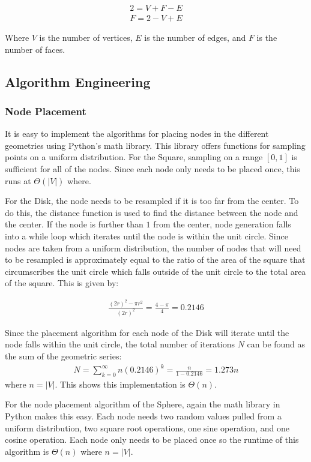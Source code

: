 \documentclass{article}
\begin{document}
        \begin{align}
            2 = V + F - E \\
            F = 2 - V + E
        \end{align}

        Where $V$ is the number of vertices, $E$ is the number of edges, and $F$ is the number of faces.

    \subsection{Algorithm Engineering}

        \subsubsection{Node Placement}
        It is easy to implement the algorithms for placing nodes in the different geometries using Python's math library. This library offers functions for sampling points on a uniform distribution. For the Square, sampling on a range $[0,1]$ is sufficient for all of the nodes. Since each node only needs to be placed once, this runs at $\Theta(|V|)$ where.
        \par
        For the Disk, the node needs to be resampled if it is too far from the center. To do this, the distance function is used to find the distance between the node and the center. If the node is further than $1$ from the center, node generation falls into a while loop which iterates until the node is within the unit circle. Since nodes are taken from a uniform distribution, the number of nodes that will need to be resampled is approximately equal to the ratio of the area of the square that circumscribes the unit circle which falls outside of the unit circle to the total area of the square. This is given by:

        \begin{align}
            \frac{(2r)^2-\pi r^2}{(2r)^2} = \frac{4-\pi}{4} = 0.2146
        \end{align}

        Since the placement algorithm for each node of the Disk will iterate until the node falls within the unit circle, the total number of iterations $N$ can be found as the sum of the geometric series:
        \begin{align}
            N = \sum_{k=0}^{\infty} n (0.2146)^k = \frac{n}{1-0.2146} = 1.273n
        \end{align}
        where $n = |V|$. This shows this implementation is $\Theta\left(n\right)$.
        \par
        For the node placement algorithm of the Sphere, again the math library in Python makes this easy. Each node needs two random values pulled from a uniform distribution, two square root operations, one sine operation, and one cosine operation. Each node only needs to be placed once so the runtime of this algorithm is $\Theta(n)$ where $n = |V|$.
\end{document}
